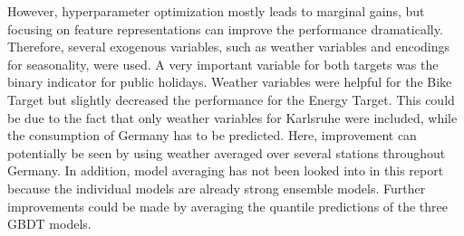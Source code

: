 However, hyperparameter optimization mostly leads to marginal gains, but focusing on feature representations can improve the performance dramatically. Therefore, several exogenous variables, such as weather variables and encodings for seasonality, were used. A very important variable for both targets was the binary indicator for public holidays. Weather variables were helpful for the Bike Target but slightly decreased the performance for the Energy Target. This could be due to the fact that only weather variables for Karlsruhe were included, while the consumption of Germany has to be predicted. Here, improvement can potentially be seen by using weather averaged over several stations throughout Germany. In addition, model averaging has not been looked into in this report because the individual models are already strong ensemble models. Further improvements could be made by averaging the quantile predictions of the three GBDT models.

